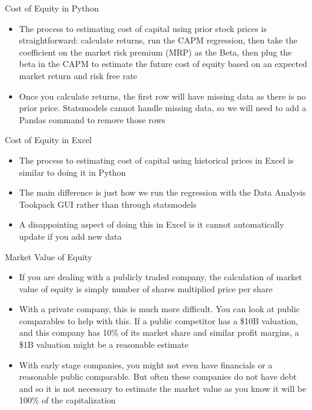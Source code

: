 \documentclass[]{article}
\begin{document}
\begin{section}{Cost of Equity in Python}
\begin{itemize}
\item The process to estimating cost of capital using prior stock prices is straightforward: calculate returns, run the CAPM regression, then take the coefficient on the market risk premium (MRP) as the Beta, then plug the beta in the CAPM to estimate the future cost of equity based on an expected market return and risk free rate
\item Once you calculate returns, the first row will have missing data as there is no prior price. Statsmodels cannot handle missing data, so we will need to add a Pandas command to remove those rows
\end{itemize}
\end{section}
\begin{section}{Cost of Equity in Excel}
\begin{itemize}
\item The process to estimating cost of capital using historical prices in Excel is similar to doing it in Python
\item The main difference is just how we run the regression with the Data Analysis Tookpack GUI rather than through statsmodels
\item A disappointing aspect of doing this in Excel is it cannot automatically update if you add new data
\end{itemize}
\end{section}
\begin{section}{Market Value of Equity}
\begin{itemize}
\item If you are dealing with a publicly traded company, the calculation of market value of equity is simply number of shares multiplied price per share
\item With a private company, this is much more difficult. You can look at public comparables to help with this. If a public competitor has a \$10B valuation, and this company has 10\% of its market share and similar profit margins, a \$1B valuation might be a reasonable estimate
\item With early stage companies, you might not even have financials or a reasonable public comparable. But often these companies do not have debt and so it is not necessary to estimate the market value as you know it will be 100\% of the capitalization
\end{itemize}
\end{section}
\end{document}
